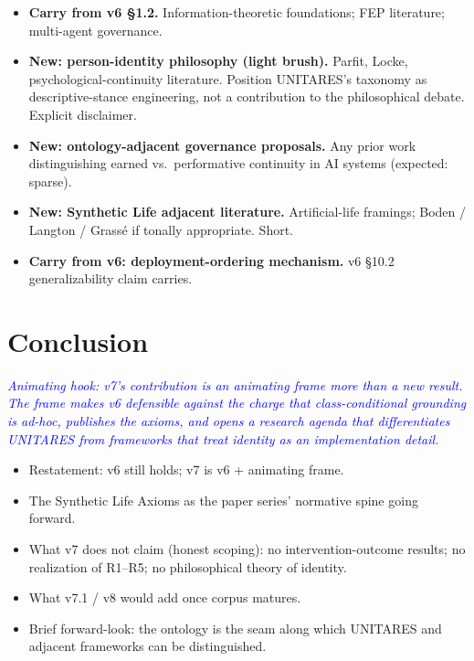 \documentclass[11pt,twocolumn]{article}
\newcommand{\outlinenote}[1]{\textcolor{blue}{\textit{#1}}}
\begin{document}
\begin{itemize}
  \item \textbf{Carry from v6 §1.2.} Information-theoretic
        foundations; FEP literature; multi-agent governance.
  \item \textbf{New: person-identity philosophy (light brush).}
        Parfit, Locke, psychological-continuity literature.
        Position UNITARES's taxonomy as descriptive-stance
        engineering, not a contribution to the philosophical
        debate. Explicit disclaimer.
  \item \textbf{New: ontology-adjacent governance proposals.}
        Any prior work distinguishing earned vs.\ performative
        continuity in AI systems (expected: sparse).
  \item \textbf{New: Synthetic Life adjacent literature.}
        Artificial-life framings; Boden / Langton / Grassé if
        tonally appropriate. Short.
  \item \textbf{Carry from v6: deployment-ordering mechanism.}
        v6 §10.2 generalizability claim carries.
\end{itemize}

\section{Conclusion}
\outlinenote{Animating hook: v7's contribution is an animating
frame more than a new result. The frame makes v6 defensible
against the charge that class-conditional grounding is ad-hoc,
publishes the axioms, and opens a research agenda that
differentiates UNITARES from frameworks that treat identity as
an implementation detail.}

\begin{itemize}
  \item Restatement: v6 still holds; v7 is v6 + animating frame.
  \item The Synthetic Life Axioms as the paper series'
        normative spine going forward.
  \item What v7 does not claim (honest scoping): no
        intervention-outcome results; no realization of R1--R5;
        no philosophical theory of identity.
  \item What v7.1 / v8 would add once corpus matures.
  \item Brief forward-look: the ontology is the seam along
        which UNITARES and adjacent frameworks can be
        distinguished.
\end{itemize}


\end{document}
